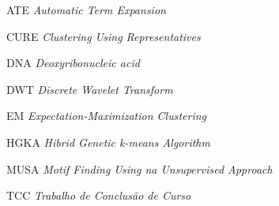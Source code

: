 \begin{siglas}
   \item[ATE]{\textit{Automatic Term Expansion}}
   \item[CURE]{\textit{Clustering Using Representatives}}
   \item[DNA]{\textit{Deoxyribonucleic acid}}
   \item[DWT]{\textit{Discrete Wavelet Transform}}
   \item[EM]{\textit{Expectation-Maximization Clustering}}
   \item[HGKA]{\textit{Hibrid Genetic k-means Algorithm}}
   \item[MUSA]{\textit{Motif Finding Using na Unsupervised Approach}}
   \item[TCC]{\textit{Trabalho de Conclusão de Curso}}
\end{siglas}